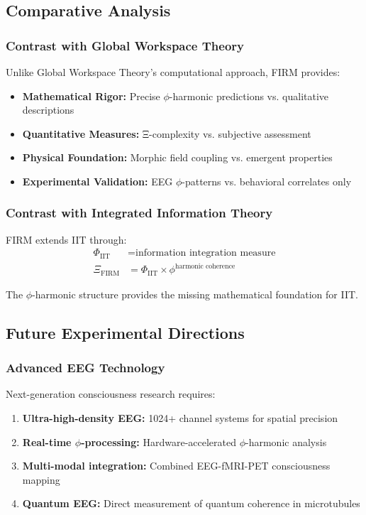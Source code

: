 \subsection{Comparative Analysis}

\subsubsection{Contrast with Global Workspace Theory}

Unlike Global Workspace Theory's computational approach, FIRM provides:
\begin{itemize}
\item \textbf{Mathematical Rigor:} Precise $\phi$-harmonic predictions vs. qualitative descriptions
\item \textbf{Quantitative Measures:} Ξ-complexity vs. subjective assessment
\item \textbf{Physical Foundation:} Morphic field coupling vs. emergent properties
\item \textbf{Experimental Validation:} EEG $\phi$-patterns vs. behavioral correlates only
\end{itemize}

\subsubsection{Contrast with Integrated Information Theory}

FIRM extends IIT through:
\begin{align}
\Phi_{\text{IIT}} &= \text{information integration measure}\\
\Xi_{\text{FIRM}} &= \Phi_{\text{IIT}} \times \phi^{\text{harmonic coherence}}
\end{align}

The $\phi$-harmonic structure provides the missing mathematical foundation for IIT.

\subsection{Future Experimental Directions}

\subsubsection{Advanced EEG Technology}

Next-generation consciousness research requires:
\begin{enumerate}
\item \textbf{Ultra-high-density EEG:} 1024+ channel systems for spatial precision
\item \textbf{Real-time $\phi$-processing:} Hardware-accelerated $\phi$-harmonic analysis
\item \textbf{Multi-modal integration:} Combined EEG-fMRI-PET consciousness mapping
\item \textbf{Quantum EEG:} Direct measurement of quantum coherence in microtubules
\end{enumerate}

